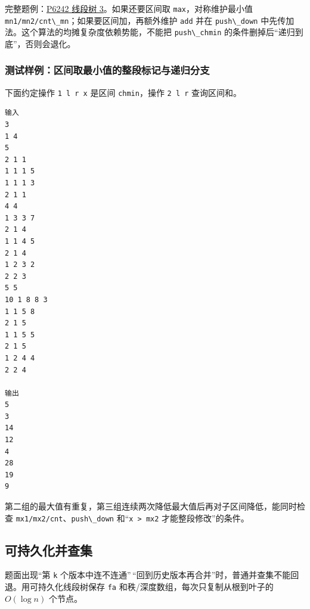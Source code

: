完整题例：\href{https://www.luogu.com.cn/problem/P6242}{P6242 线段树 3}。如果还要区间取 \passthrough{\lstinline!max!}，对称维护最小值 \passthrough{\lstinline!mn1/mn2/cnt\_mn!}；如果要区间加，再额外维护 \passthrough{\lstinline!add!} 并在 \passthrough{\lstinline!push\_down!} 中先传加法。这个算法的均摊复杂度依赖势能，不能把 \passthrough{\lstinline!push\_chmin!} 的条件删掉后``递归到底''，否则会退化。

\subsubsection{测试样例：区间取最小值的整段标记与递归分支}

下面约定操作 \passthrough{\lstinline!1 l r x!} 是区间 \passthrough{\lstinline!chmin!}，操作 \passthrough{\lstinline!2 l r!} 查询区间和。

\begin{lstlisting}
输入
3
1 4
5
2 1 1
1 1 1 5
1 1 1 3
2 1 1
4 4
1 3 3 7
2 1 4
1 1 4 5
2 1 4
1 2 3 2
2 2 3
5 5
10 1 8 8 3
1 1 5 8
2 1 5
1 1 5 5
2 1 5
1 2 4 4
2 2 4

输出
5
3
14
12
4
28
19
9
\end{lstlisting}

第二组的最大值有重复，第三组连续两次降低最大值后再对子区间降低，能同时检查 \passthrough{\lstinline!mx1/mx2/cnt!}、\passthrough{\lstinline!push\_down!} 和``\passthrough{\lstinline!x > mx2!} 才能整段修改''的条件。


\subsection{可持久化并查集}

题面出现``第 \passthrough{\lstinline!k!} 个版本中连不连通''\,``回到历史版本再合并''时，普通并查集不能回退。用可持久化线段树保存 \passthrough{\lstinline!fa!} 和秩/深度数组，每次只复制从根到叶子的 \(O(\log n)\) 个节点。

